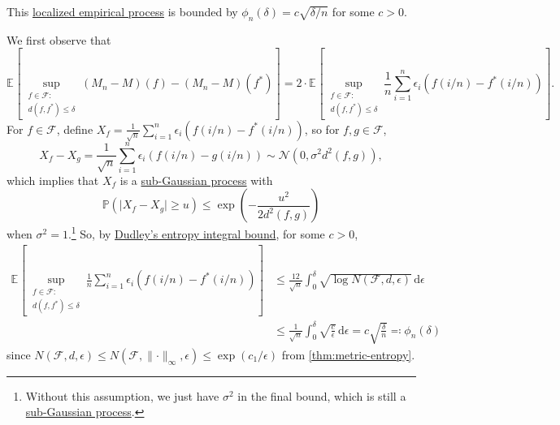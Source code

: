 \begin{claim}
	This \hyperref[def:localized-EP]{localized empirical process} is bounded by \(\phi _n (\delta ) = c \sqrt{\delta / n} \) for some \(c >0\).
\end{claim}
\begin{explanation}
	We first observe that
	\[
		\mathbb{E}_{}\left[\sup _{\substack{f\in \mathscr{F} \colon \\ d(f, f^{\ast} ) \leq \delta } } (M_n - M)(f) - (M_n - M)(f^{\ast} ) \right]
		= 2 \cdot \mathbb{E}_{}\left[\sup _{\substack{f\in \mathscr{F} \colon \\ d(f, f^{\ast} ) \leq \delta } } \frac{1}{n} \sum_{i=1}^{n} \epsilon _i \left( f (i / n) - f^{\ast} (i / n) \right) \right] .
	\]
	For \(f\in \mathscr{F} \), define \(X_f = \frac{1}{\sqrt{n} } \sum_{i=1}^{n} \epsilon _i \left( f (i / n) - f^{\ast} (i / n)  \right) \), so for \(f, g\in \mathscr{F} \),
	\[
		X_f - X_g = \frac{1}{\sqrt{n} } \sum_{i=1}^{n} \epsilon _i \left( f (i / n) - g(i / n)  \right) \sim \mathcal{N} ( 0, \sigma ^2 d^2(f, g) ) ,
	\]
	which implies that \(X_f\) is a \hyperref[def:sub-Gaussian-process]{sub-Gaussian process} with
	\[
		\mathbb{P} ( \vert X_f - X_g \vert \geq u) \leq \exp \left( - \frac{u^2}{2 d^2(f, g)} \right)
	\]
	when \(\sigma ^2 = 1\).\footnote{Without this assumption, we just have \(\sigma ^2\) in the final bound, which is still a \hyperref[def:sub-Gaussian-process]{sub-Gaussian process}.} So, by \hyperref[col:Dudley-integral-entropy-bound]{Dudley's entropy integral bound}, for some \(c> 0\),
	\[
		\begin{split}
			\mathbb{E}_{}\left[\sup _{\substack{f\in \mathscr{F} \colon                                                                                              \\ d(f, f^{\ast} ) \leq \delta } } \frac{1}{n} \sum_{i=1}^{n} \epsilon _i \left( f (i / n) - f^{\ast} (i / n) \right) \right]
			 & \leq \frac{12}{\sqrt{n} } \int_{0}^{\delta } \sqrt{\log N (\mathscr{F} , d, \epsilon )}  \,\mathrm{d}\epsilon                                         \\
			 & \leq \frac{1}{\sqrt{n} } \int_{0}^{\delta } \sqrt{\frac{c}{\epsilon } }  \,\mathrm{d}\epsilon = c \sqrt{\frac{\delta}{n}} \eqqcolon \phi _n (\delta )
		\end{split}
	\]
	since \(N(\mathscr{F} , d, \epsilon ) \leq N(\mathscr{F} , \lVert \cdot \rVert _\infty , \epsilon ) \leq \exp (c_1 / \epsilon )\) from \autoref{thm:metric-entropy}.
\end{explanation}


